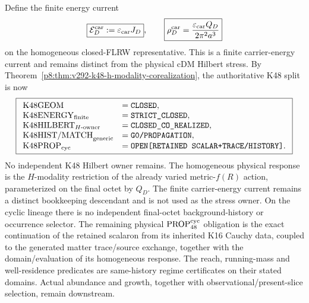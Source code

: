 \documentclass[12pt,a4paper]{article}
\begin{document}
Define the finite energy current
\[
 \boxed{\mathcal E_D^{\rm car}:=\varepsilon_{\rm car}J_D},
 \qquad
 \boxed{\rho_D^{\rm car}
 =\frac{\varepsilon_{\rm car}Q_D}{2\pi^2a^3}}
\]
on the homogeneous closed-FLRW representative.  This is a finite carrier-energy
current and remains distinct from the physical cDM Hilbert stress.  By
Theorem~\ref{p8:thm:v292-k48-h-modality-corealization}, the authoritative K48
split is now
\[
 \boxed{
 \begin{array}{ll}
 \mathrm{K48GEOM} &=\texttt{CLOSED},\\
 \mathrm{K48ENERGY}_{\rm finite} &=\texttt{STRICT\_CLOSED},\\
 \mathrm{K48HILBERT}_{H\text{-owner}} &=\texttt{CLOSED\_CO\_REALIZED},\\
 \mathrm{K48HIST/MATCH}_{\rm generic} &=\texttt{G0/PROPAGATION},\\
 \mathrm{K48PROP}_{\rm cyc} &=\texttt{OPEN[RETAINED\ SCALAR+TRACE/HISTORY]}.
 \end{array}}
\]
No independent K48 Hilbert owner remains.  The homogeneous physical response is
the $H$-modality restriction of the already varied metric-$f(R)$ action,
parameterized on the final octet by $Q_D$.  The finite carrier-energy current
remains a distinct bookkeeping descendant and is not used as the stress owner.
On the cyclic lineage there is no independent final-octet background-history
or occurrence selector.  The remaining physical
\(\mathrm{PROP}^{\rm cyc}_{48}\) obligation is the exact continuation of the
retained scalaron from its inherited K16 Cauchy data, coupled to the generated
matter trace/source exchange, together with the domain/evaluation of its
homogeneous response.  The reach, running-mass and well-residence predicates
are same-history regime certificates on their stated domains.  Actual abundance
and growth, together with observational/present-slice selection, remain
downstream.
\end{document}

